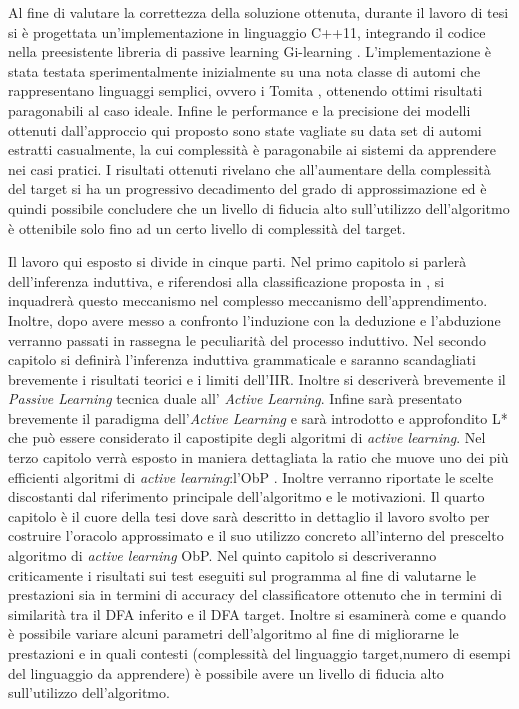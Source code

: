 Al fine di valutare la correttezza della soluzione ottenuta, durante il lavoro di tesi si è progettata un'implementazione in linguaggio C++11, integrando il codice nella preesistente libreria di passive learning Gi-learning \cite{Cot16}. L'implementazione è stata testata sperimentalmente inizialmente su una nota classe di automi che rappresentano linguaggi semplici, ovvero i Tomita \cite{Tomita82, Dupont94}, ottenendo ottimi risultati paragonabili al caso ideale.
Infine le performance e la precisione dei modelli ottenuti dall'approccio qui proposto sono state vagliate su data set di automi estratti casualmente, la cui complessità è paragonabile ai sistemi da apprendere nei casi pratici. I risultati ottenuti rivelano che all'aumentare della complessità del target si ha un progressivo decadimento del grado di approssimazione ed è quindi possibile concludere che un livello di fiducia alto sull'utilizzo dell'algoritmo è ottenibile solo fino ad un certo livello di complessità del target.

Il lavoro qui esposto si divide in cinque parti. Nel primo capitolo si parlerà dell'inferenza induttiva, e riferendosi alla classificazione proposta in \cite{Mic86a}, si inquadrerà questo meccanismo nel complesso meccanismo dell'apprendimento.
Inoltre, dopo avere messo a confronto l'induzione con la deduzione e l'abduzione verranno passati in rassegna le peculiarità del processo induttivo.
Nel secondo capitolo si definirà l'inferenza induttiva grammaticale e saranno scandagliati brevemente i risultati teorici e i limiti dell'\ac{IIR}. Inoltre si descriverà brevemente il \textit{Passive Learning} tecnica duale all' \textit{Active Learning}. Infine sarà presentato brevemente il paradigma dell'\textit{Active Learning} e sarà introdotto e approfondito L* \cite{Angluin87} che può essere considerato il capostipite degli algoritmi di \textit{active learning}.
Nel terzo capitolo verrà esposto in maniera dettagliata la ratio che muove uno dei più efficienti algoritmi di \textit{active learning}:l'\ac{ObP} . Inoltre verranno riportate le scelte discostanti dal riferimento principale dell'algoritmo \cite{Howar12} e le motivazioni.
Il quarto capitolo è il cuore della tesi dove sarà descritto in dettaglio il lavoro  svolto per costruire l'oracolo approssimato e il suo utilizzo concreto all'interno del prescelto algoritmo di \textit{active learning} \ac{ObP}.
Nel quinto capitolo si descriveranno criticamente i risultati sui test eseguiti sul programma al fine di valutarne le prestazioni sia in termini di accuracy del classificatore ottenuto che in termini di similarità tra il \ac{DFA} inferito e il \ac{DFA} target. Inoltre si esaminerà come e quando è possibile variare alcuni parametri dell'algoritmo al fine di migliorarne le prestazioni e in quali contesti (complessità del linguaggio target,numero di esempi del linguaggio da apprendere) è possibile avere un livello di fiducia alto sull'utilizzo dell'algoritmo. 
